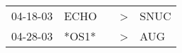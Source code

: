 \begin{supertabular}{p{0.07\textwidth}p{0.06\textwidth}p{0.02\textwidth}p{0.02\textwidth}p{0.06\textwidth}}
 04-18-03\textsuperscript{} &  ECHO\textsuperscript{} &   &  \textgreater &  SNUC\textsuperscript{} \\
 04-28-03\textsuperscript{} &                   *OS1* &   &  \textgreater &   AUG\textsuperscript{} \\
\end{supertabular}
